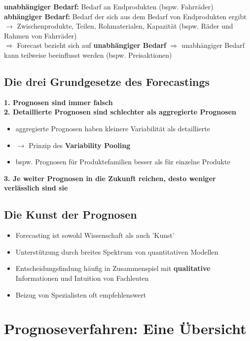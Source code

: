 \documentclass{report}
\theoremstyle{definition}
\theoremstyle{example}
\begin{document}
\textbf{unabhängiger Bedarf:} Bedarf an Endprodukten (bspw. Fahrräder)\\
\textbf{abhängiger Bedarf:} Bedarf der sich aus dem Bedarf von Endprodukten ergibt $\rightarrow$ Zwischenprodukte, Teilen, Rohmaterialen, Kapazität (bspw. Räder und Rahmen von Fahrräder)\\
$\Rightarrow$ Forecast bezieht sich auf \textbf{unabhängiger Bedarf} $\Rightarrow$ unabhängiger Bedarf kann teilweise beeinflusst werden (bspw. Preisaktionen)

   \subsection{Die drei Grundgesetze des Forecastings}
\textbf{1. Prognosen sind immer falsch}\\
\textbf{2. Detaillierte Prognosen sind schlechter als aggregierte Prognosen}
\begin{itemize}
   \item aggregierte Prognosen haben kleinere Variabilität als detaillierte
   \item $\rightarrow$ Prinzip des \textbf{Variability Pooling}
   \item bspw. Prognosen für Produktefamilien besser als für einzelne Produkte
\end{itemize}

\textbf{3. Je weiter Prognosen in die Zukunft reichen, desto weniger verlässlich sind sie}\\

      \subsection{Die Kunst der Prognosen}
\begin{itemize}
   \item Forecasting ist sowohl Wissenschaft als auch 'Kunst'
   \item Unterstützung durch breites Spektrum von quantitativen Modellen
   \item Entscheidungsfindung häufig in Zusammenspiel mit \textbf{qualitative} Informationen und Intuition von Fachleuten
   \item Beizug von Spezialisten oft empfehlenswert
\end{itemize}


\section{Prognoseverfahren: Eine Übersicht}
\end{document}
